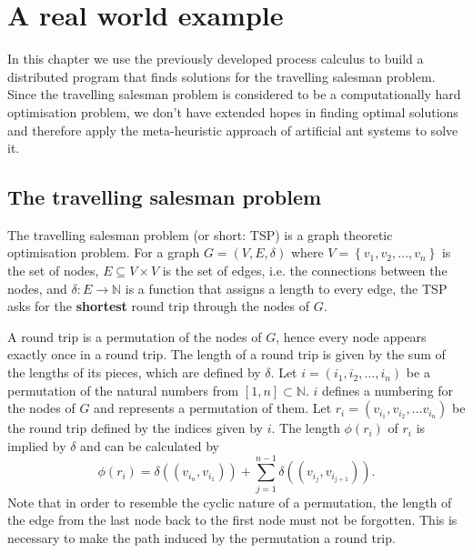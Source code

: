 \chapter{A real world example}
In this chapter we use the previously developed process calculus to build a distributed program that finds solutions for the travelling salesman problem. Since the travelling salesman problem is considered to be a computationally hard optimisation problem, we don't have extended hopes in finding optimal solutions and therefore apply the meta-heuristic approach of artificial ant systems to solve it.

\section{The travelling salesman problem}
\label{chp:tsp}
The travelling salesman problem (or short: \textsc{TSP}) is a graph theoretic optimisation problem. For a graph $G = \left( V, E, \delta \right)$ where $V = \left\{ v_1, v_2, \ldots, v_n \right\}$ is the set of nodes, $E \subseteq V \times V$ is the set of edges, i.e. the connections between the nodes, and $\delta \colon E \to \mathbb{N}$ is a function that assigns a length to every edge, the \textsc{TSP} asks for the \textbf{shortest} round trip through the nodes of $G$.



A round trip is a permutation of the nodes of $G$, hence every node appears exactly once in a round trip. The length of a round trip is given by the sum of the lengths of its pieces, which are defined by $\delta$. Let $i = \left( i_1, i_2, \ldots, i_n \right)$ be a permutation of the natural numbers from $[1, n] \subset \mathbb{N}$. $i$ defines a numbering for the nodes of $G$ and represents a permutation of them. Let $r_i = \left( v_{i_1}, v_{i_2}, \ldots v_{i_n} \right)$ be the round trip defined by the indices given by $i$. The length $\phi \left( r_i \right)$ of $r_i$ is implied by $\delta$ and can be calculated by
\begin{equation*}
  \label{eqn:length_roundtrip}
  \phi \left( r_i \right) = \delta \left( \left( v_{i_n}, v_{i_1} \right) \right) + \sum_{j=1}^{n-1} \delta \left( \left( v_{i_j}, v_{i_{j+1}} \right) \right).
\end{equation*}
Note that in order to resemble the cyclic nature of a permutation, the length of the edge from the last node back to the first node must not be forgotten. This is necessary to make the path induced by the permutation a round trip.


